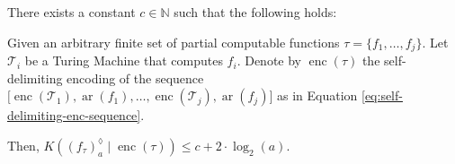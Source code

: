 \begin{theorem}
	\label{theorem:recursive-completion-kolmogorov-complexity}
	There exists a constant $c\in\mathbb{N}$ such that the following holds:
	
	Given an arbitrary finite set of partial computable functions $\tau=\{f_1,\dots,f_j\}$. 
	Let $\mathcal{T}_{i}$ be a Turing Machine that computes $f_i$.
	Denote by $\operatorname{enc}(\tau)$ the self-delimiting encoding of the sequence $\bigl[\operatorname{enc}(\mathcal{T}_1),\operatorname{ar}(f_1),\dots,\operatorname{enc}(\mathcal{T}_j),\operatorname{ar}(f_j)\bigr]$ as in Equation \ref{eq:self-delimiting-enc-sequence}.
	
	Then, $K(\left(f_{\tau}\right)_{a}^{\lozenge}\mid \operatorname{enc}(\tau))\leq c+2\cdot \log_2(a)$.
	
\end{theorem}
